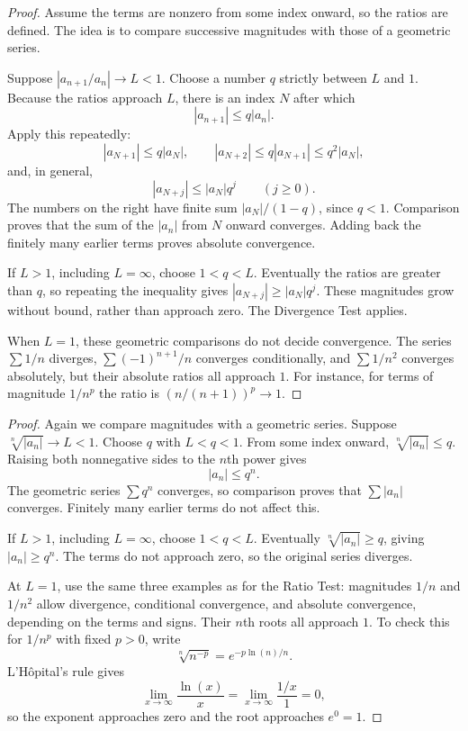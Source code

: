 \begin{proof}
Assume the terms are nonzero from some index onward, so the ratios
are defined. The idea is to compare successive magnitudes with those
of a geometric series.

Suppose $|a_{n+1}/a_n|\to L<1$. Choose a number $q$ strictly between
$L$ and $1$. Because the ratios approach $L$, there is an index $N$
after which
$$|a_{n+1}|\leq q|a_n|.$$
Apply this repeatedly:
$$|a_{N+1}|\leq q|a_N|,\qquad
|a_{N+2}|\leq q|a_{N+1}|\leq q^2|a_N|,$$
and, in general,
$$|a_{N+j}|\leq |a_N|q^j\qquad(j\geq0).$$
The numbers on the right have finite sum $|a_N|/(1-q)$, since $q<1$.
Comparison proves that the sum of the $|a_n|$ from $N$ onward converges.
Adding back the finitely many earlier terms proves absolute convergence.

If $L>1$, including $L=\infty$, choose $1<q<L$. Eventually the ratios
are greater than $q$, so repeating the inequality gives
$|a_{N+j}|\geq |a_N|q^j$. These magnitudes grow without bound, rather
than approach zero. The Divergence Test applies.

When $L=1$, these geometric comparisons do not decide convergence.
The series $\sum1/n$ diverges, $\sum(-1)^{n+1}/n$ converges
conditionally, and $\sum1/n^2$ converges absolutely, but their absolute
ratios all approach $1$. For instance, for terms of magnitude $1/n^p$
the ratio is $(n/(n+1))^p\to1$.
\end{proof}


\begin{proof}
Again we compare magnitudes with a geometric series. Suppose
$\sqrt[n]{|a_n|}\to L<1$. Choose $q$ with $L<q<1$. From some index
onward, $\sqrt[n]{|a_n|}\leq q$. Raising both nonnegative sides to
the $n$th power gives
$$|a_n|\leq q^n.$$
The geometric series $\sum q^n$ converges, so comparison proves that
$\sum|a_n|$ converges. Finitely many earlier terms do not affect this.

If $L>1$, including $L=\infty$, choose $1<q<L$. Eventually
$\sqrt[n]{|a_n|}\geq q$, giving $|a_n|\geq q^n$. The terms do not
approach zero, so the original series diverges.

At $L=1$, use the same three examples as for the Ratio Test: magnitudes
$1/n$ and $1/n^2$ allow divergence, conditional convergence, and absolute
convergence, depending on the terms and signs. Their $n$th roots all
approach $1$. To check this for $1/n^p$ with fixed $p>0$, write
$$\sqrt[n]{n^{-p}}=e^{-p\ln(n)/n}.$$
L'H\^opital's rule gives
$$\lim_{x\to\infty}\frac{\ln(x)}x
=\lim_{x\to\infty}\frac{1/x}{1}=0,$$
so the exponent approaches zero and the root approaches $e^0=1$.
\end{proof}

